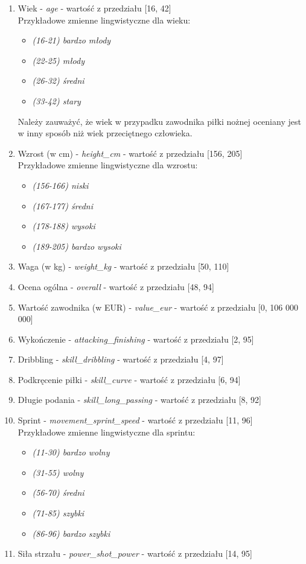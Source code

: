 \documentclass{classrep}
\begin{document}
	\begin{enumerate}
		\item Wiek - \textsl{age} - wartość z przedziału [16, 42] \\
		Przykładowe zmienne lingwistyczne dla wieku: 
		\begin{itemize}
			\item \textsl{(16-21) bardzo młody}
			\item \textsl{(22-25) młody}
			\item \textsl{(26-32) średni}
			\item \textsl{(33-42) stary}
		\end{itemize}
		Należy zauważyć, że wiek w przypadku zawodnika piłki nożnej oceniany jest w inny sposób niż wiek przeciętnego człowieka.
		\item Wzrost (w cm) - \textsl{height\_cm} - wartość z przedziału [156, 205] \\
		Przykładowe zmienne lingwistyczne dla wzrostu: 
		\begin{itemize}
			\item \textsl{(156-166) niski}
			\item \textsl{(167-177) średni}
			\item \textsl{(178-188) wysoki}
			\item \textsl{(189-205) bardzo wysoki}
		\end{itemize}
		\item Waga (w kg) - \textsl{weight\_kg} - wartość z przedziału [50, 110]
		\item Ocena ogólna - \textsl{overall} - wartość z przedziału [48, 94]
		\item Wartość zawodnika (w EUR) - \textsl{value\_eur} - wartość z przedziału [0, 106 000 000]
		\item Wykończenie - \textsl{attacking\_finishing} - wartość z przedziału [2, 95]
		\item Dribbling - \textsl{skill\_dribbling} - wartość z przedziału [4, 97]
		\item Podkręcenie piłki - \textsl{skill\_curve} - wartość z przedziału [6, 94]
		\item Długie podania - \textsl{skill\_long\_passing} - wartość z przedziału [8, 92]
		\item Sprint - \textsl{movement\_sprint\_speed} - wartość z przedziału [11, 96] \\
		Przykładowe zmienne lingwistyczne dla sprintu: 
		\begin{itemize}
			\item \textsl{(11-30) bardzo wolny}
			\item \textsl{(31-55) wolny}
			\item \textsl{(56-70) średni}
			\item \textsl{(71-85) szybki}
			\item \textsl{(86-96) bardzo szybki}
		\end{itemize}
		\item Siła strzału - \textsl{power\_shot\_power} - wartość z przedziału [14, 95]
	\end{enumerate}
\end{document}
